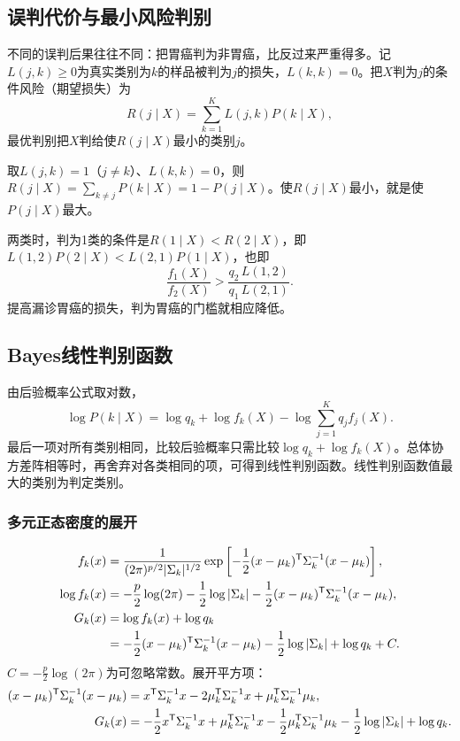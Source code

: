 \subsection{误判代价与最小风险判别}\label{sec:loss}
不同的误判后果往往不同：把胃癌判为非胃癌，比反过来严重得多。记$L(j,k)\geqslant0$为真实类别为$k$的样品被判为$j$的损失，$L(k,k)=0$。把$X$判为$j$的条件风险（期望损失）为
\[
R(j\mid X)=\sum_{k=1}^KL(j,k)P(k\mid X),
\]
最优判别把$X$判给使$R(j\mid X)$最小的类别$j$。
\begin{zm}[0--1损失下即最大后验准则]
取$L(j,k)=1$（$j\ne k$）、$L(k,k)=0$，则$R(j\mid X)=\sum_{k\ne j}P(k\mid X)=1-P(j\mid X)$。使$R(j\mid X)$最小，就是使$P(j\mid X)$最大。
\end{zm}
两类时，判为1类的条件是$R(1\mid X)<R(2\mid X)$，即$L(1,2)P(2\mid X)<L(2,1)P(1\mid X)$，也即
\[
\frac{f_1(X)}{f_2(X)}>\frac{q_2\,L(1,2)}{q_1\,L(2,1)}.
\]
提高漏诊胃癌的损失，判为胃癌的门槛就相应降低。
\subsection{Bayes线性判别函数}
由后验概率公式取对数，
\[
\log P(k\mid X)=\log q_k+\log f_k(X)-\log\sum_{j=1}^Kq_jf_j(X).
\]
最后一项对所有类别相同，比较后验概率只需比较$\log q_k+\log f_k(X)$。总体协方差阵相等时，再舍弃对各类相同的项，可得到线性判别函数。线性判别函数值最大的类别为判定类别。
\subsubsection{多元正态密度的展开}
\begin{align*}
f_k(x)&=\frac{1}{(2\pi)^{p/2}|\Sigma_k|^{1/2}}
\exp\left[-\frac12(x-\mu_k)^{\mathsf T}\Sigma_k^{-1}(x-\mu_k)\right],\\
\log f_k(x)&=-\frac p2\log(2\pi)-\frac12\log|\Sigma_k|
-\frac12(x-\mu_k)^{\mathsf T}\Sigma_k^{-1}(x-\mu_k),\\
G_k(x)&=\log f_k(x)+\log q_k\\
&=-\frac12(x-\mu_k)^{\mathsf T}\Sigma_k^{-1}(x-\mu_k)-\frac12\log|\Sigma_k|+\log q_k+C.
\end{align*}
$C=-\tfrac p2\log(2\pi)$为可忽略常数。展开平方项：
\begin{align*}
(x-\mu_k)^{\mathsf T}\Sigma_k^{-1}(x-\mu_k)
&=x^{\mathsf T}\Sigma_k^{-1}x-2\mu_k^{\mathsf T}\Sigma_k^{-1}x+\mu_k^{\mathsf T}\Sigma_k^{-1}\mu_k,\\
G_k(x)&=-\frac12x^{\mathsf T}\Sigma_k^{-1}x+\mu_k^{\mathsf T}\Sigma_k^{-1}x
-\frac12\mu_k^{\mathsf T}\Sigma_k^{-1}\mu_k-\frac12\log|\Sigma_k|+\log q_k.
\end{align*}
